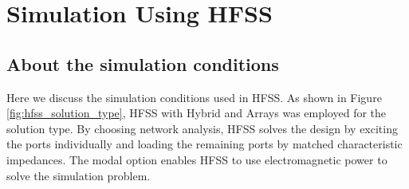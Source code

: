 \documentclass[a4paper,12pt]{report}
\begin{document}
\section{Simulation Using HFSS}

\subsection{About the simulation conditions}

Here we discuss the simulation conditions used in HFSS.
As shown in Figure \ref{fig:hfss_solution_type},
HFSS with Hybrid and Arrays was employed for the solution type.
By choosing network analysis,
HFSS solves the design by exciting the ports individually
and loading the remaining ports by matched characteristic impedances.
The modal option enables HFSS to use electromagnetic power to solve the simulation problem.
\end{document}
